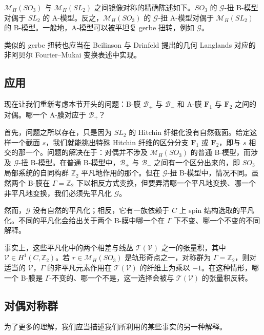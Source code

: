 \documentclass[11pt,a4paper]{article}
\begin{document}

$\mathcal{M}_H(SO_3)$ 与 $\mathcal{M}_H(SL_2)$ 之间镜像对称的精确陈述如下。$SO_3$ 的 $\mathcal{G}$-扭 B-模型对偶于 $SL_2$ 的 A-模型。反之，$\mathcal{M}_H(SO_3)$ 的 $\mathcal{G}$-扭 A-模型对偶于 $\mathcal{M}_H(SL_2)$ 的 B-模型。一般地，A-模型可以被平坦复 gerbe 扭转，例如 $\mathcal{G}$。

类似的 gerbe 扭转也应当在 Beilinson 与 Drinfeld 提出的几何 Langlands 对应的非阿贝尔 Fourier--Mukai 变换表述中实现。

\subsection{应用}

现在让我们重新考虑本节开头的问题：B-膜 $\mathcal{B}_+$ 与 $\mathcal{B}_-$ 和 A-膜 $\boldsymbol{F}_1$ 与 $\boldsymbol{F}_2$ 之间的对偶。哪一个 A-膜对应于 $\mathcal{B}_+$？

首先，问题之所以存在，只是因为 $SL_2$ 的 Hitchin 纤维化没有自然截面。给定这样一个截面 $s$，我们就能挑出特殊 Hitchin 纤维的区分分支 $\boldsymbol{F}_1$ 或 $\boldsymbol{F}_2$，即与 $s$ 相交的那一个。问题的解决在于：对偶并不涉及 $\mathcal{M}_H(SO_3)$ 的普通 B-模型，而涉及 $\mathcal{G}$-扭 B-模型。在普通 B-模型中，$\mathcal{B}_+$ 与 $\mathcal{B}_-$ 之间有一个区分出来的，即 $SO_3$ 局部系统的自同构群 $\mathbb{Z}_2$ 平凡地作用的那个。但在 $\mathcal{G}$-扭 B-模型中，情况不同。虽然两个 B-膜在 $\Gamma=\mathbb{Z}_2$ 下以相反方式变换，但要弄清哪一个平凡地变换、哪一个非平凡地变换，我们必须先平凡化 $\mathcal{G}$。

然而，$\mathcal{G}$ 没有自然的平凡化；相反，它有一族依赖于 $C$ 上 spin 结构选取的平凡化。不同的平凡化会给出关于两个 B-膜中哪一个在 $\Gamma$ 下不变、哪一个不变的不同解释。

事实上，这些平凡化中的两个相差与线丛 $\mathcal{T}(\mathcal{V})$ 之一的张量积，其中 $\mathcal{V}\in H^1(C,\mathbb{Z}_2)$。若 $r\in\mathcal{M}_H(SO_3)$ 是轨形奇点之一，对称群为 $\Gamma=\mathbb{Z}_2$，则对适当的 $\mathcal{V}$，$\Gamma$ 的非平凡元素作用在 $\mathcal{T}(\mathcal{V})$ 的纤维上为乘以 $-1$。在这种情形，哪一个 B-膜是 $\Gamma$-不变的、哪一个不是，这一选择会被与 $\mathcal{T}(\mathcal{V})$ 的张量积反转。

\subsection{对偶对称群}

为了更多的理解，我们应当描述我们所利用的某些事实的另一种解释。
\end{document}
